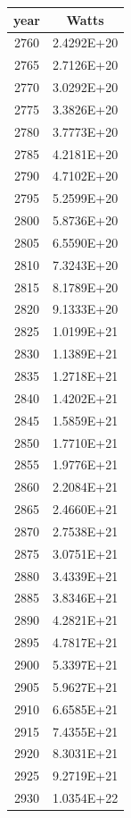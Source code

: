 \documentclass[a4paper]{article}
\begin{document}
	\begin{tabular}{|c|c|}
		\hline
		year & Watts \\
		\hline
		2760 & 2.4292E+20 \\
		\hline
		2765 & 2.7126E+20 \\
		\hline
		2770 & 3.0292E+20 \\
		\hline
		2775 & 3.3826E+20 \\
		\hline
		2780 & 3.7773E+20 \\
		\hline
		2785 & 4.2181E+20 \\
		\hline
		2790 & 4.7102E+20 \\
		\hline
		2795 & 5.2599E+20 \\
		\hline
		2800 & 5.8736E+20 \\
		\hline
		2805 & 6.5590E+20 \\
		\hline
		2810 & 7.3243E+20 \\
		\hline
		2815 & 8.1789E+20 \\
		\hline
		2820 & 9.1333E+20 \\
		\hline
		2825 & 1.0199E+21 \\
		\hline
		2830 & 1.1389E+21 \\
		\hline
		2835 & 1.2718E+21 \\
		\hline
		2840 & 1.4202E+21 \\
		\hline
		2845 & 1.5859E+21 \\
		\hline
		2850 & 1.7710E+21 \\
		\hline
		2855 & 1.9776E+21 \\
		\hline
		2860 & 2.2084E+21 \\
		\hline
		2865 & 2.4660E+21 \\
		\hline
		2870 & 2.7538E+21 \\
		\hline
		2875 & 3.0751E+21 \\
		\hline
		2880 & 3.4339E+21 \\
		\hline
		2885 & 3.8346E+21 \\
		\hline
		2890 & 4.2821E+21 \\
		\hline
		2895 & 4.7817E+21 \\
		\hline
		2900 & 5.3397E+21 \\
		\hline
		2905 & 5.9627E+21 \\
		\hline
		2910 & 6.6585E+21 \\
		\hline
		2915 & 7.4355E+21 \\
		\hline
		2920 & 8.3031E+21 \\
		\hline
		2925 & 9.2719E+21 \\
		\hline
		2930 & 1.0354E+22 \\

\end{tabular}
\end{document}
